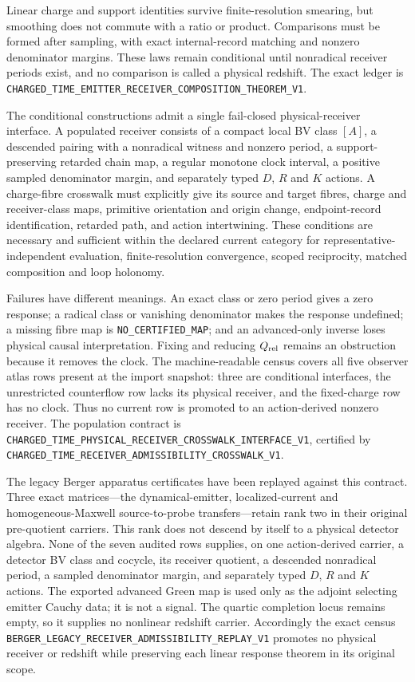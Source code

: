 \documentclass[11pt]{article}
\theoremstyle{definition}
\theoremstyle{remark}
\begin{document}
Linear charge and support identities survive finite-resolution smearing, but
smoothing does not commute with a ratio or product.  Comparisons must be
formed after sampling, with exact internal-record matching and nonzero
denominator margins.  These laws remain conditional until nonradical receiver
periods exist, and no comparison is called a physical redshift.  The exact
ledger is \texttt{CHARGED\_TIME\_EMITTER\_RECEIVER\_COMPOSITION\_THEOREM\_V1}.

The conditional constructions admit a single fail-closed physical-receiver
interface.  A populated receiver consists of a compact local BV class $[A]$,
a descended pairing with a nonradical witness and nonzero period, a
support-preserving retarded chain map, a regular monotone clock interval, a
positive sampled denominator margin, and separately typed $D$, $R$ and $K$
actions.  A charge-fibre crosswalk must explicitly give its source and target
fibres, charge and receiver-class maps, primitive orientation and origin
change, endpoint-record identification, retarded path, and action
intertwining.  These conditions are necessary and sufficient within the
declared current category for representative-independent evaluation,
finite-resolution convergence, scoped reciprocity, matched composition and
loop holonomy.

Failures have different meanings.  An exact class or zero period gives a zero
response; a radical class or vanishing denominator makes the response
undefined; a missing fibre map is \texttt{NO\_CERTIFIED\_MAP}; and an
advanced-only inverse loses physical causal interpretation.  Fixing and
reducing $Q_{\rm rel}$ remains an obstruction because it removes the clock.
The machine-readable census covers all five observer atlas rows present at
the import snapshot: three are conditional interfaces, the unrestricted
counterflow row lacks its physical receiver, and the fixed-charge row has no
clock.  Thus no current row is promoted to an action-derived nonzero receiver.
The population contract is
\texttt{CHARGED\_TIME\_PHYSICAL\_RECEIVER\_CROSSWALK\_INTERFACE\_V1}, certified
by \texttt{CHARGED\_TIME\_RECEIVER\_ADMISSIBILITY\_CROSSWALK\_V1}.

The legacy Berger apparatus certificates have been replayed against this
contract.  Three exact matrices---the dynamical-emitter, localized-current and
homogeneous-Maxwell source-to-probe transfers---retain rank two in their
original pre-quotient carriers.  This rank does not descend by itself to a
physical detector algebra.  None of the seven audited rows supplies, on one
action-derived carrier, a detector BV class and cocycle, its receiver quotient,
a descended nonradical period, a sampled denominator margin, and separately
typed $D$, $R$ and $K$ actions.  The exported advanced Green map is used only
as the adjoint selecting emitter Cauchy data; it is not a signal.  The quartic
completion locus remains empty, so it supplies no nonlinear redshift carrier.
Accordingly the exact census
\texttt{BERGER\_LEGACY\_RECEIVER\_ADMISSIBILITY\_REPLAY\_V1} promotes no
physical receiver or redshift while preserving each linear response theorem in
its original scope.
\end{document}
